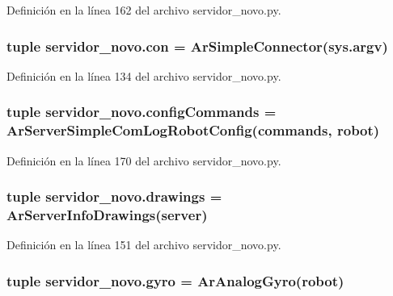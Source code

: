 Definición en la línea 162 del archivo servidor\_\-novo.py.

\hypertarget{namespaceservidor__novo_a201a5b59bc2f5a75d2a4c82d81f17180}{
\subsubsection[{con}]{\setlength{\rightskip}{0pt plus 5cm}tuple {\bf servidor\_\-novo.con} = ArSimpleConnector(sys.argv)}}
\label{namespaceservidor__novo_a201a5b59bc2f5a75d2a4c82d81f17180}


Definición en la línea 134 del archivo servidor\_\-novo.py.

\hypertarget{namespaceservidor__novo_a0b77e4ad4ff622636ae781f9e76c0bba}{
\subsubsection[{configCommands}]{\setlength{\rightskip}{0pt plus 5cm}tuple {\bf servidor\_\-novo.configCommands} = ArServerSimpleComLogRobotConfig({\bf commands}, {\bf robot})}}
\label{namespaceservidor__novo_a0b77e4ad4ff622636ae781f9e76c0bba}


Definición en la línea 170 del archivo servidor\_\-novo.py.

\hypertarget{namespaceservidor__novo_aaddb28ac7dd14daa90eaadd8fde37bbd}{
\subsubsection[{drawings}]{\setlength{\rightskip}{0pt plus 5cm}tuple {\bf servidor\_\-novo.drawings} = ArServerInfoDrawings({\bf server})}}
\label{namespaceservidor__novo_aaddb28ac7dd14daa90eaadd8fde37bbd}


Definición en la línea 151 del archivo servidor\_\-novo.py.

\hypertarget{namespaceservidor__novo_a2b0e3a19479a3a456184ce1f64a648a0}{
\subsubsection[{gyro}]{\setlength{\rightskip}{0pt plus 5cm}tuple {\bf servidor\_\-novo.gyro} = ArAnalogGyro({\bf robot})}}
\label{namespaceservidor__novo_a2b0e3a19479a3a456184ce1f64a648a0}


